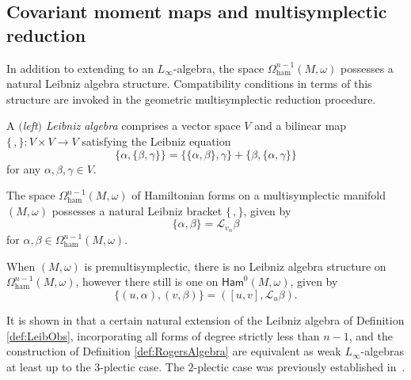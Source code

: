 \documentclass[pdftex]{sigma}
\numberwithin{equation}{section}
\newcommand{\Ham}{\mathsf{Ham}}
\newcommand{\ham}{\text{ham}}
\renewcommand{\L}{\mathscr{L}}
\begin{document}
\subsection{Covariant moment maps and multisymplectic reduction}\label{Ssec:MultiRed}

In addition to extending to an $L_\infty$-algebra, the space $\Omega^{n-1}_{\ham}(M,\omega)$ possesses a natural Leibniz algebra structure. Compatibility conditions in terms of this structure are invoked in the geometric multisymplectic reduction procedure.

\begin{Definition}
	A \emph{$($left$)$ Leibniz algebra} comprises a vector space $V$ and a bilinear map $\{\,,\}\colon V\times V\to V$ satisfying the Leibniz equation
	\[
		\{\alpha,\{\beta,\gamma\}\} = \{\{\alpha,\beta\},\gamma\} + \{\beta,\{\alpha,\gamma\}\}
	\]
	for any $\alpha,\beta,\gamma \in V$.
\end{Definition}

\begin{Definition}\label{def:LeibObs}
	The space $\Omega_\ham^{n-1}(M,\omega)$ of Hamiltonian forms on a multisymplectic manifold $(M,\omega)$ possesses a natural Leibniz bracket $\{\,,\}$, given by
	\[
		\{\alpha,\beta\} = \L_{v_\alpha}\beta
	\]
	for $\alpha,\beta\in\Omega_\ham^{n-1}(M,\omega)$.
\end{Definition}

When $(M,\omega)$ is premultisymplectic, there is no Leibniz algebra structure on $\Omega_\ham^{n-1}(M,\omega)$, however there still is one on $\Ham^0(M,\omega)$, given by
\[
	\{(u,\alpha),(v,\beta)\}=([u,v], \L_u\beta).
\]

\begin{Remark}
	It is shown in \cite[Proposition~5.2]{Dehling17} that a certain natural extension of the Leibniz algebra of Definition \ref{def:LeibObs}, incorporating all forms of degree strictly less than $n-1$, and the construction of Definition \ref{def:RogersAlgebra} are equivalent as weak $L_\infty$-algebras at least up to the $3$-plectic case. The $2$-plectic case was previously established in~\cite{BaezHoffnungRogers10}.
\end{Remark}
\end{document}
